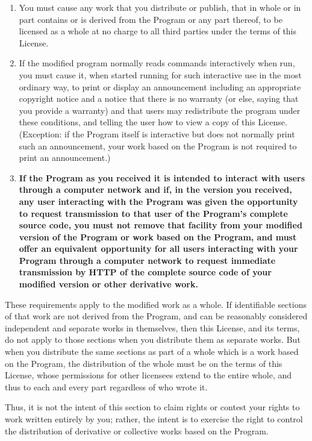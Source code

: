 \documentclass[11pt, letterpaper]{book}
\begin{document}
\begin{enumerate}
\begin{enumerate}
\item

You must cause any work that you distribute or publish, that in
whole or in part contains or is derived from the Program or any
part thereof, to be licensed as a whole at no charge to all third
parties under the terms of this License.

\item
If the modified program normally reads commands interactively
when run, you must cause it, when started running for such
interactive use in the most ordinary way, to print or display an
announcement including an appropriate copyright notice and a
notice that there is no warranty (or else, saying that you provide
a warranty) and that users may redistribute the program under
these conditions, and telling the user how to view a copy of this
License.  (Exception: if the Program itself is interactive but
does not normally print such an announcement, your work based on
the Program is not required to print an announcement.)

\item
\textbf{If the Program as you received it is intended to interact with users
through a computer network and if, in the version you received, any
user interacting with the Program was given the opportunity to request
transmission to that user of the Program's complete source code, you
must not remove that facility from your modified version of the
Program or work based on the Program, and must offer an equivalent
opportunity for all users interacting with your Program through a
computer network to request immediate transmission by HTTP of the
complete source code of your modified version or other derivative
work.}

\end{enumerate}


These requirements apply to the modified work as a whole.  If
identifiable sections of that work are not derived from the Program,
and can be reasonably considered independent and separate works in
themselves, then this License, and its terms, do not apply to those
sections when you distribute them as separate works.  But when you
distribute the same sections as part of a whole which is a work based
on the Program, the distribution of the whole must be on the terms of
this License, whose permissions for other licensees extend to the
entire whole, and thus to each and every part regardless of who wrote it.

Thus, it is not the intent of this section to claim rights or contest
your rights to work written entirely by you; rather, the intent is to
exercise the right to control the distribution of derivative or
collective works based on the Program.


\end{enumerate}
\end{document}
